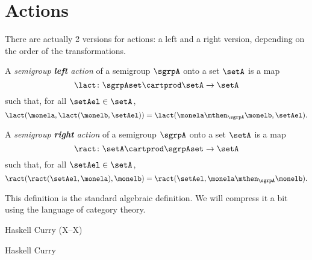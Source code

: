 

%


\section{Actions}

There are actually 2 versions for actions: a left and a right version, depending on the order of the transformations.


\begin{ctdefinition}\label{def:semigroup-left-action-prelim}
  A \emph{semigroup \textbf{left} action} of a semigroup $\sgrpA$ onto a set $\setA$ is a map
  \begin{equation}\label{eq:lact}
    \lact \colon \sgrpAset \cartprod \setA \to \setA
  \end{equation}
  such that, for all $\setAel \in \setA$,
  \begin{equation}\label{eq:lact1cond}
    \lact(\monela, \lact(\monelb, \setAel)) = \lact(\monela \mthen_\sgrpA \monelb, \setAel).
  \end{equation}
\end{ctdefinition}


\begin{ctdefinition}\label{def:semigroup-right-action-prelim}
  A \emph{semigroup \textbf{right} action} of a semigroup $\sgrpA$ onto a set $\setA$ is a map
  \begin{equation}\label{eq:ract}
    \ract \colon \setA \cartprod \sgrpAset \to \setA
  \end{equation}
  such that, for all $\setAel \in \setA$,
  \begin{equation}\label{eq:ract1cond}
    \ract(\ract(\setAel, \monela), \monelb) = \ract(\setAel, \monela \mthen_\sgrpA \monelb).
  \end{equation}
\end{ctdefinition}


This definition is the standard algebraic definition.
We will compress it a bit using the language of category theory.

\begin{marginfigure}
  \caption{Haskell Curry (X--X)}
  \label{fig:haskell-curry}
Haskell Curry
\end{marginfigure}


